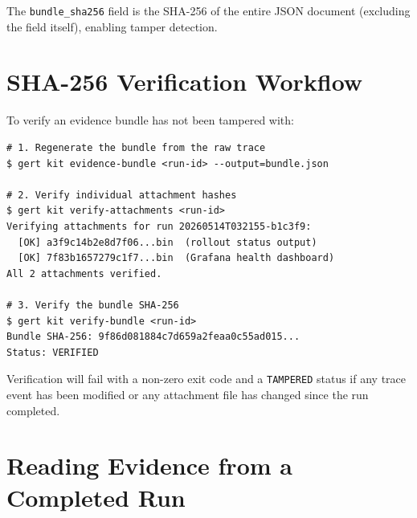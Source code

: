 The \texttt{bundle\_sha256} field is the SHA-256 of the entire JSON document (excluding the
field itself), enabling tamper detection.

\section{SHA-256 Verification Workflow}
\label{sec:evidence-sha256}

To verify an evidence bundle has not been tampered with:

\begin{verbatim}
# 1. Regenerate the bundle from the raw trace
$ gert kit evidence-bundle <run-id> --output=bundle.json

# 2. Verify individual attachment hashes
$ gert kit verify-attachments <run-id>
Verifying attachments for run 20260514T032155-b1c3f9:
  [OK] a3f9c14b2e8d7f06...bin  (rollout status output)
  [OK] 7f83b1657279c1f7...bin  (Grafana health dashboard)
All 2 attachments verified.

# 3. Verify the bundle SHA-256
$ gert kit verify-bundle <run-id>
Bundle SHA-256: 9f86d081884c7d659a2feaa0c55ad015...
Status: VERIFIED
\end{verbatim}

Verification will fail with a non-zero exit code and a \texttt{TAMPERED} status if any trace
event has been modified or any attachment file has changed since the run completed.

\section{Reading Evidence from a Completed Run}
\label{sec:evidence-reading}

